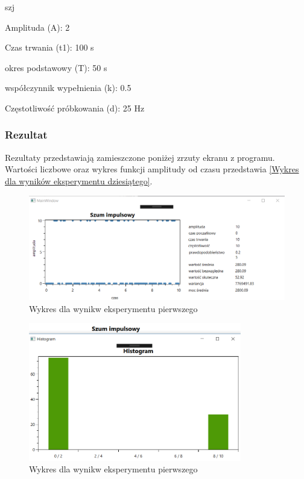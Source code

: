 \documentclass[12pt]{article}
\begin{document}
\begin{labeling}{szj}
\item [Amplituda (A):] 2
\item [Czas trwania (t1):] 100 s
\item [okres podstawowy (T):] 50 s
\item [współczynnik wypełnienia (k):] 0.5
\item [Częstotliwość próbkowania (d): ] 25 Hz
\end{labeling}

\subsubsection{Rezultat}
Rezultaty przedstawiają zamieszczone poniżej zrzuty ekranu z programu. Wartości liczbowe oraz wykres funkcji amplitudy od czasu przedstawia \ref{Wykres dla wyników eksperymentu dziesiątego}.
\begin{figure}[h!]
 \centering
 \includegraphics[width=12.3cm]{SzumImp.PNG}
 \vspace{-0.3cm}
 \caption{Wykres dla wynikw eksperymentu pierwszego}
 \label{rysunek do eksperymentu pierwszego}
\end{figure}
\newpage
\begin{figure}[h!]
 \centering
 \includegraphics[width=9.3cm]{SzumImpHist.PNG}
 \vspace{-0.3cm}
 \caption{Wykres dla wynikw eksperymentu pierwszego}
 \label{rysunek do eksperymentu pierwszego}
\end{figure}
\end{document}
